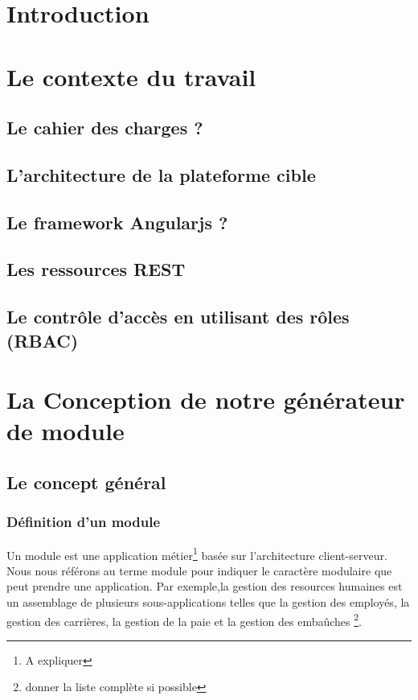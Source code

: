\documentclass[a4paper,11pt]{report}
\begin{document}
\chapter{Introduction}

\chapter{Le contexte du travail}
\section{Le cahier des charges ?}
\section{L'architecture de la plateforme cible}
\section{Le framework Angularjs ?}
\section{Les ressources REST}
\section{Le contrôle d'accès en utilisant des rôles (RBAC)}

\chapter{La Conception de notre générateur de module}
\section{Le concept général}
\subsection{Définition d'un module}

Un module est une application métier\footnote{A expliquer} basée sur
l'architecture client-serveur. Nous nous référons au terme module pour
indiquer le caractère modulaire que peut prendre une application. Par
exemple,la gestion des resources humaines est un assemblage de
plusieurs sous-applications telles que la gestion des employés, la
gestion des carrières, la gestion de la paie et la gestion des
embaûches \footnote{donner la liste complète si possible}. 
\end{document}
